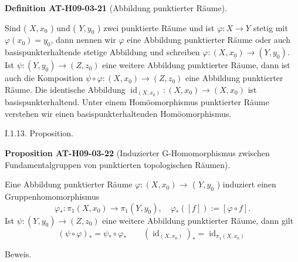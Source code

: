 \documentclass[10pt, letterpaper]{article}
\newcommand{\CustomHeading}[3]{%
  \par\medskip\noindent%
  \textbf{#1 #2} \textnormal{(#3)}.\enskip%
}
\newenvironment{DEF}[2]{\begin{unitbox}\CustomHeading{Definition}{#1}{#2}}{\end{unitbox}}
\newenvironment{PROP}[2]{\begin{unitbox}\CustomHeading{Proposition}{#1}{#2}}{\end{unitbox}}
\begin{document}
\begin{DEF}{AT-H09-03-21}{Abbildung punktierter Räume}
Sind ( $X, x_{0}$ ) und ( $Y, y_{0}$ ) zwei punktierte Räume und ist $\varphi: X \rightarrow Y$ stetig mit $\varphi\left(x_{0}\right)=y_{0}$, dann nennen wir $\varphi$ eine Abbildung punktierter Räume oder auch basispunkterhaltende stetige Abbildung und schreiben $\varphi:\left(X, x_{0}\right) \rightarrow\left(Y, y_{0}\right)$. Ist $\psi:\left(Y, y_{0}\right) \rightarrow\left(Z, z_{0}\right)$ eine weitere Abbildung punktierter Räume, dann ist auch die Komposition $\psi \circ \varphi:\left(X, x_{0}\right) \rightarrow\left(Z, z_{0}\right)$ eine Abbildung punktierter Räume. Die identische Abbildung $\operatorname{id}_{\left(X, x_{0}\right)}:\left(X, x_{0}\right) \rightarrow\left(X, x_{0}\right)$ ist basispunkterhaltend. Unter einem Homöomorphismus punktierter Räume verstehen wir einen basispunkterhaltenden Homöomorphismus.
\end{DEF}


I.1.13. Proposition. 

\begin{PROP}{AT-H09-03-22}{Induzierter G-Homomorphismus zwischen Fundamentalgruppen von punktierten topologischen Räumen}
Eine Abbildung punktierter Räume $\varphi:\left(X, x_{0}\right) \rightarrow$ ( $Y, y_{0}$ ) induziert einen Gruppenhomomorphismus
$$
\varphi_{*}: \pi_{1}\left(X, x_{0}\right) \rightarrow \pi_{1}\left(Y, y_{0}\right), \quad \varphi_{*}([f]):=[\varphi \circ f] .
$$
Ist $\psi:\left(Y, y_{0}\right) \rightarrow\left(Z, z_{0}\right)$ eine weitere Abbildung punktierter Räume, dann gilt 
$$(\psi \circ \varphi)_{*}=\psi_{*} \circ \varphi_{*} \qquad \left(\operatorname{id}_{\left(X, x_{0}\right)}\right)_{*}=\operatorname{id}_{\pi_{1}\left(X, x_{0}\right)}$$
\end{PROP}



Beweis. 
\end{document}
